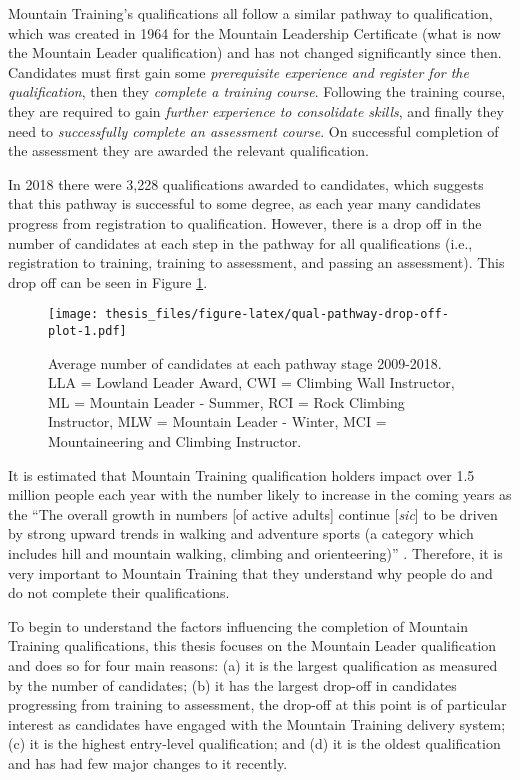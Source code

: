 \documentclass[
  12pt,
  a4paper,
]{book}
\begin{document}
Mountain Training's qualifications all follow a similar pathway to qualification, which was created in 1964 for the Mountain Leadership Certificate (what is now the Mountain Leader qualification) and has not changed significantly since then. Candidates must first gain some \emph{prerequisite experience and register for the qualification}, then they \emph{complete a training course}. Following the training course, they are required to gain \emph{further experience to consolidate skills}, and finally they need to \emph{successfully complete an assessment course}. On successful completion of the assessment they are awarded the relevant qualification.

In 2018 there were 3,228 qualifications awarded to candidates, which suggests that this pathway is successful to some degree, as each year many candidates progress from registration to qualification. However, there is a drop off in the number of candidates at each step in the pathway for all qualifications (i.e., registration to training, training to assessment, and passing an assessment). This drop off can be seen in Figure \ref{fig:qual-pathway-drop-off-plot}.

\begin{figure}
\centering
\texttt{[image: thesis\_files/figure-latex/qual-pathway-drop-off-plot-1.pdf]}
\caption{\label{fig:qual-pathway-drop-off-plot}Average number of candidates at each pathway stage 2009-2018. LLA = Lowland Leader Award, CWI = Climbing Wall Instructor, ML = Mountain Leader - Summer, RCI = Rock Climbing Instructor, MLW = Mountain Leader - Winter, MCI = Mountaineering and Climbing Instructor.}
\end{figure}

It is estimated that Mountain Training qualification holders impact over 1.5 million people each year \citep{MTE2019} with the number likely to increase in the coming years as the ``The overall growth in numbers {[}of active adults{]} continue {[}\emph{sic}{]} to be driven by strong upward trends in walking and adventure sports (a category which includes hill and mountain walking, climbing and orienteering)'' \citep[p 14]{SportEngland2020}. Therefore, it is very important to Mountain Training that they understand why people do and do not complete their qualifications.

To begin to understand the factors influencing the completion of Mountain Training qualifications, this thesis focuses on the Mountain Leader qualification and does so for four main reasons: (a) it is the largest qualification as measured by the number of candidates; (b) it has the largest drop-off in candidates progressing from training to assessment, the drop-off at this point is of particular interest as candidates have engaged with the Mountain Training delivery system; (c) it is the highest entry-level qualification; and (d) it is the oldest qualification and has had few major changes to it recently.
\end{document}
